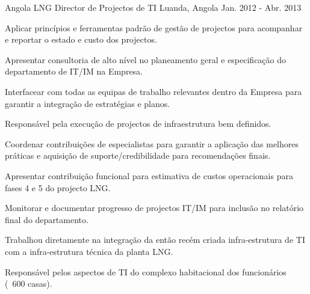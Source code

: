 \begin{cventries}
\cventry
{Angola LNG} %
{Director de Projectos de TI} %
{Luanda, Angola} %
{Jan. 2012 - Abr. 2013} %
{ %
\begin{cvitems}
\item {Aplicar princípios e ferramentas padrão de gestão de projectos para acompanhar e reportar o estado e custo dos projectos.}
\item {Apresentar consultoria de alto nível no planeamento geral e especificação do departamento de IT/IM na Empresa.}
\item {Interfacear com todas as equipas de trabalho relevantes dentro da Empresa para garantir a integração de estratégias e planos.}
\item {Responsável pela execução de projectos de infraestrutura bem definidos.}
\item {Coordenar contribuições de especialistas para garantir a aplicação das melhores práticas e aquisição de suporte/credibilidade para recomendações finais.}
\item {Apresentar contribuição funcional para estimativa de custos operacionais para fases 4 e 5 do projecto LNG.}
\item {Monitorar e documentar progresso de projectos IT/IM para inclusão no relatório final do departamento.}
\item {Trabalhou diretamente na integração da então recém criada infra-estrutura de TI com a infra-estrutura técnica da planta LNG.}
\item {Responsável pelos aspectos de TI do complexo habitacional dos funcionários (~600 casas).}
\end{cvitems}
}



\end{cventries}
